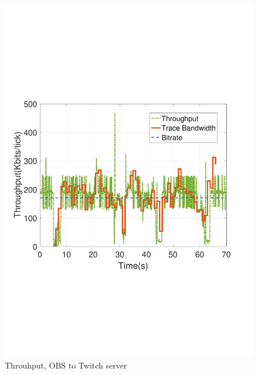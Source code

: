 \begin{figure}[htb]
  \includegraphics[width=\linewidth]{fig/obs_twitch.pdf}
  \caption{Throuhput, OBS to Twitch server}
  \label{fig:obs-twitch}
\endminipage
\end{figure}

